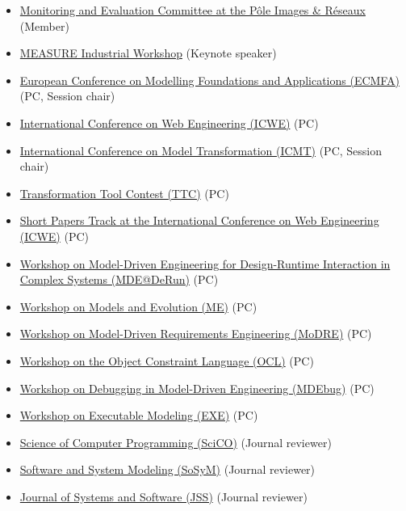 \begin{itemize}
\tightlist
\item
  \href{http://www.images-et-reseaux.com/en}{Monitoring and Evaluation
  Committee at the Pôle Images \& Réseaux} (Member)
\item
  \href{http://measure.softeam-rd.eu/events-workshops/itea3measureindustrialworkshopeventinnanteson15thjune2018}{MEASURE
  Industrial Workshop} (Keynote speaker)
\item
  \href{http://eventmall.info/ecmfa2018/}{European Conference on
  Modelling Foundations and Applications (ECMFA)} (PC, Session chair)
\item
  \href{http://icwe2018.webengineering.org/}{International Conference on
  Web Engineering (ICWE)} (PC)
\item
  \href{https://icmt2018.github.io/}{International Conference on Model
  Transformation (ICMT)} (PC, Session chair)
\item
  \href{http://www.transformation-tool-contest.eu/}{Transformation Tool
  Contest (TTC)} (PC)
\item
  \href{http://icwe2018.webengineering.org/}{Short Papers Track at the
  International Conference on Web Engineering (ICWE)} (PC)
\item
  \href{https://megamart2-ecsel.eu/mde-derun-2018/}{Workshop on
  Model-Driven Engineering for Design-Runtime Interaction in Complex
  Systems (MDE@DeRun)} (PC)
\item
  \href{http://www.models-and-evolution.com/2018/}{Workshop on Models
  and Evolution (ME)} (PC)
\item
  \href{http://www.modre2018.ece.mcgill.ca/}{Workshop on Model-Driven
  Requirements Engineering (MoDRE)} (PC)
\item
  \href{https://oclworkshop.github.io/2018/}{Workshop on the Object
  Constraint Language (OCL)} (PC)
\item
  \href{https://msdl.uantwerpen.be/conferences/MDEbug/2018/}{Workshop on
  Debugging in Model-Driven Engineering (MDEbug)} (PC)
\item
  \href{http://www.modelexecution.org/?page_id=2173}{Workshop on
  Executable Modeling (EXE)} (PC)
\item
  \href{http://www.journals.elsevier.com/science-of-computer-programming/}{Science
  of Computer Programming (SciCO)} (Journal reviewer)
\item
  \href{http://www.sosym.org/}{Software and System Modeling (SoSyM)}
  (Journal reviewer)
\item
  \href{http://www.journals.elsevier.com/journal-of-systems-and-software}{Journal
  of Systems and Software (JSS)} (Journal reviewer)
\end{itemize}

